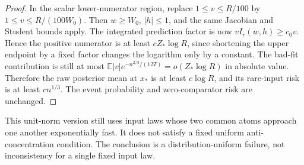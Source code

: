 \begin{proof}
In the scalar lower-numerator region, replace $1\le v\le R/100$ by
$1\le v\le R/(100W_0)$. Then $w\ge W_0$, $|h|\le1$, and the same Jacobian and Student bounds apply. The integrated prediction factor is now $v I_r(w,h)\ge c_0v$. Hence the positive numerator is at least $cZ_*\log R$, since shortening the upper endpoint by a fixed factor changes the logarithm only by a constant. The bad-fit contribution is still at most
$\mathbb E|v|e^{-n^{2/3}/(12T)}=o(Z_*\log R)$ in absolute value.
Therefore the raw posterior mean at $x_*$ is at least $c\log R$, and its rare-input risk is at least $c n^{1/3}$. The event probability and zero-comparator risk are unchanged.
\end{proof}

This unit-norm version still uses input laws whose two common atoms approach one another exponentially fast. It does not satisfy a fixed uniform anti-concentration condition. The conclusion is a distribution-uniform failure, not inconsistency for a single fixed input law.

